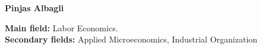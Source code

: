 \documentclass[letterpaper, 12pt]{article}
\begin{document}
	
	
	\thispagestyle{first}
	\begin{center}
		\LARGE
		\textbf{Pinjas Albagli}
	\end{center}
	
	\vspace{-2ex}
	\begin{center}
		\small\textbf{Main field:} Labor Economics.\\
		\textbf{Secondary fields:} Applied Microeconomics, Industrial Organization
	\end{center}
	\vspace{2ex}


	
	
	
	\bigskip
		
	
	
	
	\bigskip
	
	
	
	
	\bigskip
	
	
	
	
	\bigskip
	
	
	
	
	\bigskip
	
	
	
	
	\bigskip
	
	
	
	
	\bigskip
	
	
	
	
	

	\thispagestyle{last}
\end{document}
